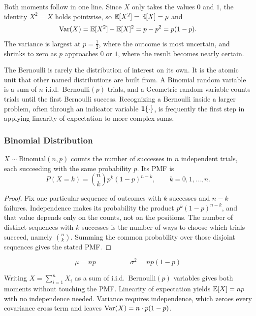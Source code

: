 Both moments follow in one line. Since $X$ only takes the values $0$ and $1$, the identity $X^2 = X$ holds pointwise, so $\mathbb{E}[X^2] = \mathbb{E}[X] = p$ and
\[
\operatorname{Var}(X) = \mathbb{E}[X^2] - \mathbb{E}[X]^2 = p - p^2 = p(1-p).
\]
The variance is largest at $p = \tfrac{1}{2}$, where the outcome is most uncertain, and shrinks to zero as $p$ approaches $0$ or $1$, where the result becomes nearly certain.

\vspace{1em}

\begin{keybox}
The Bernoulli is rarely the distribution of interest on its own. It is the atomic unit that other named distributions are built from. A Binomial random variable is a sum of $n$ i.i.d.\ Bernoulli$(p)$ trials, and a Geometric random variable counts trials until the first Bernoulli success. Recognizing a Bernoulli inside a larger problem, often through an indicator variable $\mathbf{1}\{\cdot\}$, is frequently the first step in applying linearity of expectation to more complex sums.
\end{keybox}

\subsubsection{Binomial Distribution}

\begin{definition}[Binomial]
$X \sim \text{Binomial}(n,p)$ counts the number of successes in $n$ independent trials, each succeeding with the same probability $p$. Its PMF is
\[
P(X=k) = \binom{n}{k} p^k (1-p)^{n-k}, \qquad k = 0, 1, \dots, n.
\]
\end{definition}

\begin{proof}
Fix one particular sequence of outcomes with $k$ successes and $n-k$ failures. Independence makes its probability the product $p^k (1-p)^{n-k}$, and that value depends only on the counts, not on the positions. The number of distinct sequences with $k$ successes is the number of ways to choose which trials succeed, namely $\binom{n}{k}$. Summing the common probability over those disjoint sequences gives the stated PMF.
\end{proof}
\[
\mu = np \hspace{5em} \sigma^2 = np(1-p)
\]

Writing $X = \sum_{i=1}^n X_i$ as a sum of i.i.d.\ Bernoulli$(p)$ variables gives both moments without touching the PMF. Linearity of expectation yields $\mathbb{E}[X] = np$ with no independence needed. Variance requires independence, which zeroes every covariance cross term and leaves $\operatorname{Var}(X) = n \cdot p(1-p)$.

